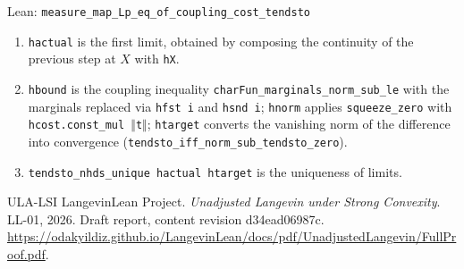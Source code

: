 \documentclass[11pt,a4paper]{article}
\begin{document}
\begin{leanbox}{Lean: \texttt{measure\_\allowbreak{}map\_\allowbreak{}Lp\_\allowbreak{}eq\_\allowbreak{}of\_\allowbreak{}coupling\_\allowbreak{}cost\_\allowbreak{}tendsto}}
\begin{enumerate}
\item \texttt{hactual} is the first limit, obtained by composing the continuity of the previous step at \(X\) with \texttt{h\allowbreak{}X}.

\item \texttt{hbound} is the coupling inequality \texttt{char\allowbreak{}Fun\_\allowbreak{}marginals\_\allowbreak{}norm\_\allowbreak{}sub\_\allowbreak{}le} with the marginals replaced via \texttt{hfst i} and \texttt{hsnd i}; \texttt{hnorm} applies \texttt{squeeze\_\allowbreak{}zero} with \texttt{hcost.\allowbreak{}const\_\allowbreak{}mul \ensuremath{\Vert}t\ensuremath{\Vert}}; \texttt{htarget} converts the vanishing norm of the difference into convergence (\texttt{tendsto\_\allowbreak{}iff\_\allowbreak{}norm\_\allowbreak{}sub\_\allowbreak{}tendsto\_\allowbreak{}zero}).

\item \texttt{tendsto\_\allowbreak{}nhds\_\allowbreak{}unique hactual htarget} is the uniqueness of limits.

\end{enumerate}
\end{leanbox}

\begin{thebibliography}{ULA-LSI}
LangevinLean Project. \emph{Unadjusted Langevin under Strong Convexity}. LL-01, 2026. Draft report, content revision d34ead06987c. \url{https://odakyildiz.github.io/LangevinLean/docs/pdf/UnadjustedLangevin/FullProof.pdf}.
\end{thebibliography}
\end{document}
